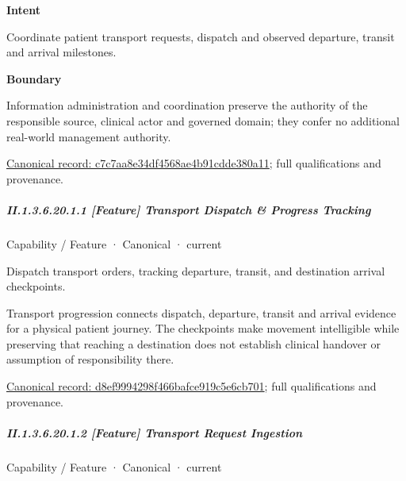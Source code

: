 \textbf{Intent}



Coordinate patient transport requests, dispatch and observed departure, transit and arrival milestones.



\textbf{Boundary}



Information administration and coordination preserve the authority of the responsible source, clinical actor and governed domain; they confer no additional real-world management authority.


{\footnotesize \href{../../../../continuum/strategy/capability/c7c7aa8e34df4568ae4b91cdde380a11.md}{Canonical record: c7c7aa8e34df4568ae4b91cdde380a11}; full qualifications and provenance.}\par
\subparagraph*{II.1.3.6.20.1.1 [Feature] Transport Dispatch \& Progress Tracking}
\label{navigation:II.1.3.6.20.1.1}

\label{element:d8ef9994298f466bafce919c5e6cb701}
{\small Capability / Feature · Canonical · current}\par

Dispatch transport orders, tracking departure, transit, and destination arrival checkpoints.



Transport progression connects dispatch, departure, transit and arrival evidence for a physical patient journey. The checkpoints make movement intelligible while preserving that reaching a destination does not establish clinical handover or assumption of responsibility there.


{\footnotesize \href{../../../../continuum/strategy/capability/feature/d8ef9994298f466bafce919c5e6cb701.md}{Canonical record: d8ef9994298f466bafce919c5e6cb701}; full qualifications and provenance.}\par
\subparagraph*{II.1.3.6.20.1.2 [Feature] Transport Request Ingestion}
\label{navigation:II.1.3.6.20.1.2}

\label{element:7104472d065840eb91ae4cb7a3a0cb43}
{\small Capability / Feature · Canonical · current}\par

